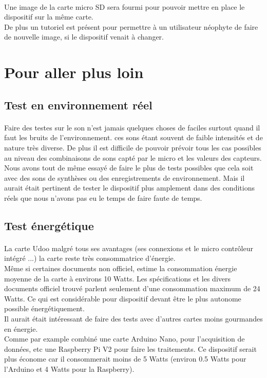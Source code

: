 \documentclass[a4paper, titlepage, oneside, 12pt]{article}%
\begin{document}
\paragraph{}
Une image de la carte micro SD sera fourmi pour pouvoir mettre en place le dispositif sur la même carte.\\
De plus un tutoriel est présent pour  permettre à un utilisateur néophyte de faire de nouvelle image, si le dispositif venait à changer.

\section{Pour aller plus loin}
\subsection{Test en environnement réel}
\paragraph{}
Faire des testes sur le son n'est jamais quelques choses de faciles surtout quand il faut les bruits de l'environnement. ces sons étant souvent de faible intensités et de nature très diverse. De plus il est difficile de pouvoir prévoir tous les cas possibles au niveau des combinaisons de sons capté par le micro et les valeurs des capteurs.\\
Nous avons tout de même essayé de faire le plus de tests possibles que cela soit avec des sons de synthèses ou des enregistrements de environnement. Mais il aurait était pertinent de tester le dispositif plus amplement dans des conditions réels que nous n'avons pas eu le temps de faire faute de temps. 

\subsection{Test énergétique}
\paragraph{}
La carte Udoo malgré tous ses avantages (ses connexions et le micro contrôleur intégré ...) la carte reste très consommatrice d’énergie.\\
Même si certaines documents non officiel, estime la consommation énergie moyenne de la carte à environs 10 Watts. Les spécifications et les divers documents officiel trouvé parlent seulement d'une consommation maximum de 24 Watts. Ce qui est considérable pour dispositif devant être le plus autonome possible énergétiquement.\\
Il aurait était intéressant de faire des tests avec d'autres cartes moins gourmandes en énergie.\\
Comme par example combiné une carte Arduino Nano, pour l’acquisition de données, etc une Raspberry Pi V2 pour faire les traitements. Ce dispositif serait plus économe car il consommerait moins de 5 Watts (environ  0.5 Watts pour l'Arduino et 4 Watts pour la Raspberry).\\
\end{document}
